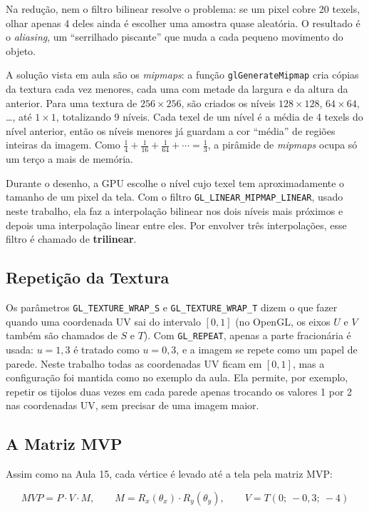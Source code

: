 \documentclass{article}
\begin{document}
Na redução, nem o filtro bilinear resolve o problema: se um pixel cobre 20 texels, olhar apenas 4 deles ainda é escolher uma amostra quase aleatória. O resultado é o \textit{aliasing}, um ``serrilhado piscante'' que muda a cada pequeno movimento do objeto.

A solução vista em aula são os \textit{mipmaps}: a função \texttt{glGenerateMipmap} cria cópias da textura cada vez menores, cada uma com metade da largura e da altura da anterior. Para uma textura de $256\times256$, são criados os níveis $128\times128$, $64\times64$, \ldots, até $1\times1$, totalizando 9 níveis. Cada texel de um nível é a média de 4 texels do nível anterior, então os níveis menores já guardam a cor ``média'' de regiões inteiras da imagem. Como $\frac{1}{4} + \frac{1}{16} + \frac{1}{64} + \cdots = \frac{1}{3}$, a pirâmide de \textit{mipmaps} ocupa só um terço a mais de memória.

Durante o desenho, a GPU escolhe o nível cujo texel tem aproximadamente o tamanho de um pixel da tela. Com o filtro \texttt{GL\_LINEAR\_MIPMAP\_LINEAR}, usado neste trabalho, ela faz a interpolação bilinear nos dois níveis mais próximos e depois uma interpolação linear entre eles. Por envolver três interpolações, esse filtro é chamado de \textbf{trilinear}.

\subsection{Repetição da Textura}

Os parâmetros \texttt{GL\_TEXTURE\_WRAP\_S} e \texttt{GL\_TEXTURE\_WRAP\_T} dizem o que fazer quando uma coordenada UV sai do intervalo $[0, 1]$ (no OpenGL, os eixos $U$ e $V$ também são chamados de $S$ e $T$). Com \texttt{GL\_REPEAT}, apenas a parte fracionária é usada: $u = 1{,}3$ é tratado como $u = 0{,}3$, e a imagem se repete como um papel de parede. Neste trabalho todas as coordenadas UV ficam em $[0, 1]$, mas a configuração foi mantida como no exemplo da aula. Ela permite, por exemplo, repetir os tijolos duas vezes em cada parede apenas trocando os valores 1 por 2 nas coordenadas UV, sem precisar de uma imagem maior.

\subsection{A Matriz MVP}

Assim como na Aula 15, cada vértice é levado até a tela pela matriz MVP:

\begin{equation}\label{eq:mvp}
MVP = P \cdot V \cdot M, \qquad M = R_x(\theta_x) \cdot R_y(\theta_y), \qquad V = T(0;\ -0{,}3;\ -4)
\end{equation}
\end{document}

